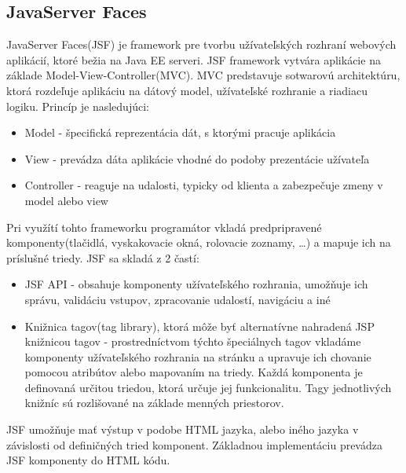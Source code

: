 \subsection{JavaServer Faces}\label{jsfkap}
JavaServer Faces(JSF) je framework pre tvorbu užívateľských rozhraní webových aplikácií, ktoré bežia na Java EE serveri\cite{jsfbook}. JSF framework vytvára aplikácie na základe  Model-View-Controller(MVC). MVC predstavuje sotwarovú architektúru, ktorá rozdeľuje aplikáciu na dátový model, užívateľské rozhranie a riadiacu logiku. Princíp je nasledujúci:
\begin{itemize}
\item Model - špecifická reprezentácia dát, s ktorými pracuje aplikácia
\item View - prevádza dáta aplikácie vhodné do podoby prezentácie užívateľa
\item Controller - reaguje na udalosti, typicky od klienta a zabezpečuje zmeny v model alebo view

\end{itemize}
Pri využítí tohto frameworku programátor vkladá predpripravené komponenty(tlačidlá, vyskakovacie okná, rolovacie zoznamy, \ldots) a mapuje ich na príslušné triedy. JSF sa skladá z 2 častí:
\begin{itemize}
\item JSF API - obsahuje komponenty užívateľského rozhrania, umožňuje ich správu, validáciu vstupov, zpracovanie udalostí, navigáciu a iné
\item Knižnica tagov(tag library), ktorá môže byť alternatívne nahradená JSP knižnicou tagov - prostredníctvom týchto špeciálnych tagov vkladáme komponenty užívateľského rozhrania na stránku a upravuje ich chovanie pomocou atribútov alebo mapovaním na triedy. Každá komponenta je definovaná určitou triedou, ktorá určuje jej funkcionalitu. Tagy jednotlivých knižníc sú rozlišované na základe menných priestorov.
\end{itemize}

JSF umožňuje mať výstup v podobe HTML jazyka, alebo iného jazyka v závislosti od definičných tried komponent. Základnou implementáciu prevádza JSF komponenty do HTML kódu.
